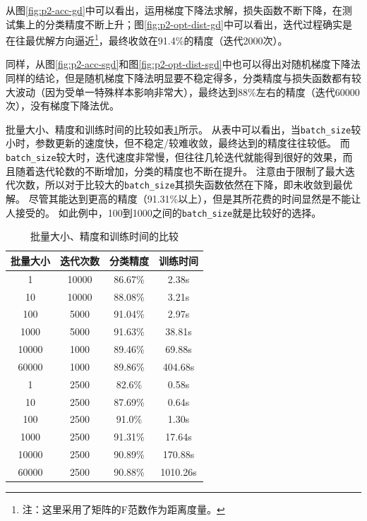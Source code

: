 \documentclass[logo,reportComp]{thesis}
\begin{document}
从图\ref{fig:p2-acc-gd}中可以看出，运用梯度下降法求解，损失函数不断下降，在测试集上的分类精度不断上升；图\ref{fig:p2-opt-dist-gd}中可以看出，迭代过程确实是在往最优解方向逼近\footnote{注：这里采用了矩阵的F范数作为距离度量。}，最终收敛在91.4\%的精度（迭代2000次）。

同样，从图\ref{fig:p2-acc-sgd}和图\ref{fig:p2-opt-dist-sgd}中也可以得出对随机梯度下降法同样的结论，但是随机梯度下降法明显要不稳定得多，分类精度与损失函数都有较大波动（因为受单一特殊样本影响非常大），最终达到88\%左右的精度（迭代60000次），没有梯度下降法优。

批量大小、精度和训练时间的比较如表\ref{tab:minibatch}所示。
从表中可以看出，当\verb'batch_size'较小时，参数更新的速度快，但不稳定/较难收敛，最终达到的精度往往较低。
而\verb'batch_size'较大时，迭代速度非常慢，但往往几轮迭代就能得到很好的效果，而且随着迭代轮数的不断增加，分类的精度也不断在提升。
注意由于限制了最大迭代次数，所以对于比较大的\verb'batch_size'其损失函数依然在下降，即未收敛到最优解。
尽管其能达到更高的精度（91.31\%以上），但是其所花费的时间显然是不能让人接受的。
如此例中，100到1000之间的\verb'batch_size'就是比较好的选择。
\begin{table}[H]
\caption{批量大小、精度和训练时间的比较}
\label{tab:minibatch}
\centering
\begin{tabular}{|c|c|c|c|}\hline
\textbf{批量大小} & \textbf{迭代次数} & \textbf{分类精度} & \textbf{训练时间}\\\hline
1 & 10000 & 86.67\% & 2.38s\\\hline
10 & 10000 & 88.08\% & 3.21s\\\hline
100 & 5000 & 91.04\% & 2.97s\\\hline
1000 & 5000 & 91.63\% & 38.81s\\\hline
10000 & 1000 & 89.46\% & 69.88s\\\hline
60000 & 1000 & 89.86\% & 404.68s\\\hline
1 & 2500 & 82.6\% & 0.58s\\\hline
10 & 2500 & 87.69\% & 0.64s\\\hline
100 & 2500 & 91.0\% & 1.30s\\\hline
1000 & 2500 & 91.31\% & 17.64s\\\hline
10000 & 2500 & 90.89\% & 170.88s\\\hline
60000 & 2500 & 90.88\% & 1010.26s\\\hline
\end{tabular}
\end{table}
\end{document}
